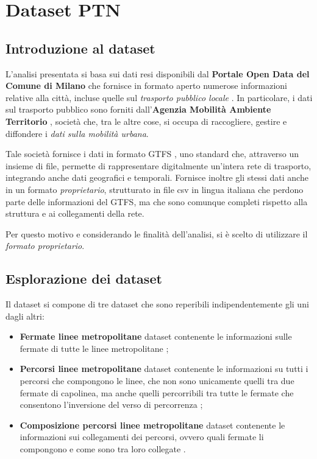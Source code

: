 \chapter{Dataset PTN}
\label{cap1}

\section{Introduzione al dataset}
L'analisi presentata si basa sui dati resi disponibili dal \textbf{Portale Open Data del Comune di Milano} che fornisce in formato aperto numerose informazioni relative alla città, incluse quelle sul \textit{trasporto pubblico locale} \cite{ComuneMilanoOpenData}. In particolare, i dati sul trasporto pubblico sono forniti dall'\textbf{Agenzia Mobilità Ambiente Territorio} \cite{Amat}, società che, tra le altre cose, si occupa di raccogliere, gestire e diffondere i \textit{dati sulla mobilità urbana}.

Tale società fornisce i dati in formato GTFS \cite{GTFS}, uno standard che, attraverso un insieme di file, permette di rappresentare digitalmente un'intera rete di trasporto, integrando anche dati geografici e temporali. Fornisce inoltre gli stessi dati anche in un formato \textit{proprietario}, strutturato in file csv in lingua italiana che perdono parte delle informazioni del GTFS, ma che sono comunque completi rispetto alla struttura e ai collegamenti della rete.

Per questo motivo e considerando le finalità dell'analisi, si è scelto di utilizzare il \textit{formato proprietario}.

\section{Esplorazione dei dataset}
Il dataset si compone di tre dataset che sono reperibili indipendentemente gli uni dagli altri:
\begin{itemize}
    \item \textbf{Fermate linee metropolitane} dataset contenente le informazioni sulle fermate di tutte le linee metropolitane \cite{FermateLineeMetropolitane};
    \item \textbf{Percorsi linee metropolitane} dataset contenente le informazioni su tutti i percorsi che compongono le linee, che non sono unicamente quelli tra due fermate di capolinea, ma anche quelli percorribili tra tutte le fermate che consentono l'inversione del verso di percorrenza \cite{PercorsiLineeMetropolitane};
    \item \textbf{Composizione percorsi linee metropolitane} dataset contenente le informazioni sui collegamenti dei percorsi, ovvero quali fermate li compongono e come sono tra loro collegate \cite{ComposizionePercorsiLineeMetropolitane}.
\end{itemize}

